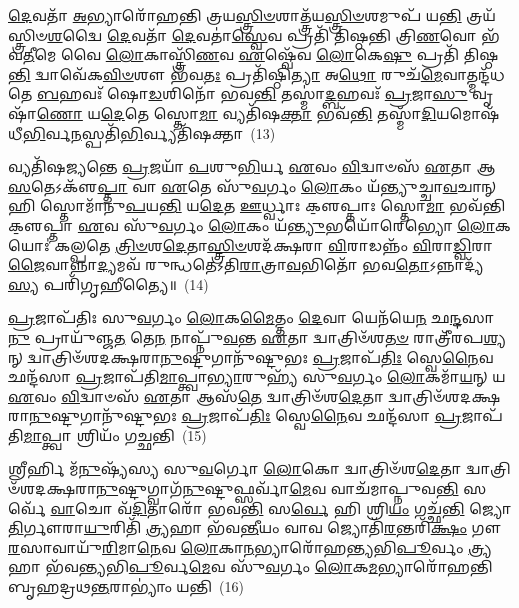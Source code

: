 \-\ul{𑌦𑍇}\-𑌵𑌤𑌾᳴ \ul{𑌅}\-𑌭𑍍𑌯𑌾𑌰𑍋᳴𑌹𑌨𑍍𑌤𑌿 𑌤𑍍𑌰𑌯\-\ul{𑌸𑍍𑌤𑍍𑌰𑌿}\-\-\ul{𑍞}\-𑌶𑌾𑌤𑍍𑌤𑍍𑌰᳴𑌯\-\ul{𑌸𑍍𑌤𑍍𑌰𑌿}\-\-\ul{𑍞}\-𑌶𑌮𑍁𑌪᳴ 𑌯\-\ul{𑌨𑍍𑌤𑌿} 𑌤𑍍𑌰𑌯᳴𑌸𑍍𑌤𑍍𑌰𑌿𑍞\-\ul{𑌶}\-𑌦𑍍𑌵𑍈 \ul{𑌦𑍇}\-𑌵𑌤𑌾᳴ \ul{𑌦𑍇}\-𑌵𑌤𑌾॑\-\ul{𑌸𑍍𑌵𑍇}\-𑌵 𑌪𑍍𑌰𑌤𑌿᳴ 𑌤𑌿𑌷𑍍𑌠𑌨𑍍𑌤𑌿 𑌤𑍍𑌰𑌿\-\ul{𑌣}\-𑌵𑍋 𑌭᳴𑌵\-\ul{𑌤𑍀}\-𑌮𑍇 𑌵𑍈 \ul{𑌲𑍋}\-𑌕𑌾𑌸𑍍𑌤𑍍𑌰𑌿᳴\-\ul{𑌣}\-𑌵 \ul{𑌏}\-𑌷𑍍𑌵𑍇᳴𑌵 \ul{𑌲𑍋}\-𑌕𑍇\-\ul{𑌷𑍁} 𑌪𑍍𑌰𑌤𑌿᳴ 𑌤𑌿𑌷𑍍𑌠\-\ul{𑌨𑍍𑌤𑌿} 𑌦𑍍𑌵𑌾𑌵𑍇᳴𑌕\-\ul{𑌵𑌿}\-\-\ul{𑍞}\-𑌶𑍗 𑌭᳴𑌵\-\ul{𑌤𑌃} 𑌪𑍍𑌰𑌤𑌿᳴𑌷𑍍𑌠𑌿\-\ul{𑌤𑍍𑌯𑌾} 𑌅\-\ul{𑌥𑍋} 𑌰𑍁𑌚᳴\-\ul{𑌮𑍇}\-𑌵𑌾𑌤𑍍𑌮𑌨𑍍𑌦᳴𑌧𑌤𑍇 \ul{𑌬}\-𑌹𑌵𑌃᳴ 𑌷𑍋\-\ul{𑌡}\-𑌶𑌿𑌨𑍋᳴ 𑌭𑌵\-\ul{𑌨𑍍𑌤𑌿} 𑌤𑌸𑍍𑌮𑌾॑\-\ul{𑌦𑍍𑌬}\-𑌹𑌵𑌃᳴ \ul{𑌪𑍍𑌰}\-𑌜𑌾\-\ul{𑌸𑍁} 𑌵𑍃𑌷𑌾᳴\-\ul{𑌣𑍋} 𑌯\-\ul{𑌦𑍇}\-𑌤𑍇 𑌸𑍍𑌤𑍋\-\ul{𑌮𑌾} 𑌵𑍍𑌯𑌤𑌿᳴𑌷\-\ul{𑌕𑍍𑌤𑌾} 𑌭𑌵᳴\-\ul{𑌨𑍍𑌤𑌿} 𑌤𑌸𑍍𑌮𑌾᳴\-\ul{𑌦𑌿}\-𑌯𑌮𑍋𑌷᳴𑌧𑍀\-\ul{𑌭𑌿}\-𑌰𑍍𑌵\-\ul{𑌨}\-𑌸𑍍𑌪𑌤𑌿᳴\-\ul{𑌭𑌿}\-𑌰𑍍𑌵𑍍𑌯𑌤𑌿᳴𑌷𑌕𑍍𑌤𑌾~(13)

𑌵𑍍𑌯𑌤𑌿᳴𑌷𑌜𑍍𑌯𑌨𑍍𑌤𑍇 \ul{𑌪𑍍𑌰}\-𑌜𑌯𑌾᳴ \ul{𑌪}\-𑌶𑍁\-\ul{𑌭𑌿}\-𑌰𑍍𑌯 \ul{𑌏}\-𑌵𑌂 \ul{𑌵𑌿}\-𑌦𑍍𑌵𑌾𑍞𑌸᳴ \ul{𑌏}\-𑌤𑌾 𑌆\-\ul{𑌸}\-𑌤𑍇\-𑌽𑌕𑍢᳴\-\ul{𑌪𑍍𑌤𑌾} 𑌵𑌾 \ul{𑌏}\-𑌤𑍇 𑌸𑍁᳴\-\ul{𑌵}\-𑌰𑍍𑌗𑌂 \ul{𑌲𑍋}\-𑌕𑌂 𑌯᳴𑌨𑍍𑌤𑍍𑌯𑍁𑌚𑍍𑌚𑌾\-\ul{𑌵}\-𑌚𑌾𑌨𑍍 𑌹𑌿 𑌸𑍍𑌤𑍋𑌮𑌾᳴𑌨𑍁\-\ul{𑌪}\-𑌯\-\ul{𑌨𑍍𑌤𑌿} 𑌯\-\ul{𑌦𑍇}\-𑌤 \ul{𑌊}\-𑌰𑍍𑌧𑍍𑌵𑌾𑌃 𑌕𑍢॒𑌪𑍍𑌤𑌾𑌃 𑌸𑍍𑌤𑍋\-\ul{𑌮𑌾} 𑌭𑌵᳴𑌨𑍍𑌤𑌿 𑌕𑍢॒𑌪𑍍𑌤𑌾 \ul{𑌏}\-𑌵 𑌸𑍁᳴\-\ul{𑌵}\-𑌰𑍍𑌗𑌂 \ul{𑌲𑍋}\-𑌕𑌂 𑌯᳴\-\ul{𑌨𑍍𑌤𑍍𑌯𑍁}\-𑌭𑌯𑍋᳴𑌰𑍇𑌭𑍍𑌯𑍋 \ul{𑌲𑍋}\-𑌕𑌯𑍋𑌃॑ 𑌕𑌲𑍍𑌪𑌤𑍇 \ul{𑌤𑍍𑌰𑌿}\-\-\ul{𑍞}\-𑌶\-\ul{𑌦𑍇}\-𑌤𑌾\-\ul{𑌸𑍍𑌤𑍍𑌰𑌿}\-\-\ul{𑍞}\-𑌶𑌦᳴𑌕𑍍𑌷𑌰𑌾 \ul{𑌵𑌿}\-𑌰𑌾𑌡𑌨𑍍𑌨𑌂᳴ \ul{𑌵𑌿}\-𑌰𑌾\-\ul{𑌡𑍍𑌵𑌿}\-𑌰𑌾\-\ul{𑌜𑍈}\-𑌵𑌾𑌨𑍍𑌨𑌾\-\ul{𑌦𑍍𑌯}\-𑌮𑌵᳴ 𑌰𑍁𑌨𑍍𑌧𑌤𑍇\-𑌽𑌤𑌿\-\ul{𑌰𑌾}\-𑌤𑍍𑌰𑌾\-\ul{𑌵}\-𑌭𑌿𑌤𑍋᳴ 𑌭𑌵\-\ul{𑌤𑍋}\-\-𑌽𑌨𑍍𑌨𑌾𑌦𑍍𑌯᳴\-\ul{𑌸𑍍𑌯} 𑌪𑌰𑌿᳴𑌗𑍃𑌹𑍀𑌤𑍍𑌯𑍈॥~(14)

{\anuvakamend[{𑌓𑌷᳴𑌧𑍀𑌃 𑌸𑌂𑌵\-\ul{𑌥𑍍𑌸}\-𑌰 \ul{𑌏}\-𑌵𑌾𑌵᳴ 𑌪𑍍𑌰\-\ul{𑌤𑌿}\-𑌷𑍍𑌠𑌾\-\ul{𑌯} 𑌵𑍍𑌯𑌤𑌿᳴\-\ul{𑌷}\-𑌕𑍍𑌤𑍈\-\ul{𑌕𑌾}\-𑌨𑍍𑌨𑌪᳴\-\ul{𑌞𑍍𑌚𑌾}\-𑌶𑌚𑍍𑌚᳴}]}%

\-\ul{𑌪𑍍𑌰}\-𑌜𑌾𑌪᳴𑌤𑌿𑌃 𑌸𑍁\-\ul{𑌵}\-𑌰𑍍𑌗𑌂 \ul{𑌲𑍋}\-𑌕\-\ul{𑌮𑍈}\-𑌤𑍍𑌤𑌂 \ul{𑌦𑍇}\-𑌵𑌾 𑌯𑍇𑌨᳴𑌯𑍇\-\ul{𑌨} 𑌛\-\ul{𑌨𑍍𑌦}\-𑌸𑌾\-\ul{𑌨𑍁} 𑌪𑍍𑌰𑌾𑌯𑍁᳴𑌞𑍍𑌜\-\ul{𑌤} 𑌤𑍇\-\ul{𑌨} 𑌨𑌾𑌪𑍍𑌨𑍁᳴\-\ul{𑌵}\-𑌨𑍍𑌤 \ul{𑌏}\-𑌤𑌾 𑌦𑍍𑌵𑌾𑌤𑍍𑌰𑌿𑍞᳴𑌶\-\ul{𑌤}\-\-\ul{𑍞} 𑌰𑌾𑌤𑍍𑌰𑍀᳴𑌰𑌪\-\ul{𑌶𑍍𑌯}\-𑌨𑍍 𑌦𑍍𑌵𑌾𑌤𑍍𑌰𑌿𑍞᳴𑌶𑌦𑌕𑍍𑌷𑌰𑌾\-\ul{𑌨𑍁}\-𑌷𑍍𑌟𑍁𑌗𑌾𑌨𑍁᳴𑌷𑍍𑌟𑍁𑌭𑌃 \ul{𑌪𑍍𑌰}\-𑌜𑌾𑌪᳴\-\ul{𑌤𑌿𑌃} 𑌸𑍍𑌵𑍇\-\ul{𑌨𑍈}\-𑌵 𑌛𑌨𑍍𑌦᳴𑌸𑌾 \ul{𑌪𑍍𑌰}\-𑌜𑌾𑌪᳴𑌤𑌿\-\ul{𑌮𑌾}\-𑌪𑍍𑌤𑍍𑌵𑌾\-\ul{𑌭𑍍𑌯𑌾}\-𑌰𑍁𑌹𑍍𑌯᳴ 𑌸𑍁\-\ul{𑌵}\-𑌰𑍍𑌗𑌂 \ul{𑌲𑍋}\-𑌕𑌮𑌾᳴\-\ul{𑌯}\-𑌨𑍍 𑌯 \ul{𑌏}\-𑌵𑌂 \ul{𑌵𑌿}\-𑌦𑍍𑌵𑌾𑍞𑌸᳴ \ul{𑌏}\-𑌤𑌾 𑌆𑌸᳴\-\ul{𑌤𑍇} 𑌦𑍍𑌵𑌾𑌤𑍍𑌰𑌿𑍞᳴𑌶\-\ul{𑌦𑍇}\-𑌤𑌾 𑌦𑍍𑌵𑌾𑌤𑍍𑌰𑌿𑍞᳴𑌶𑌦𑌕𑍍𑌷𑌰𑌾\-\ul{𑌨𑍁}\-𑌷𑍍𑌟𑍁𑌗𑌾𑌨𑍁᳴𑌷𑍍𑌟𑍁𑌭𑌃 \ul{𑌪𑍍𑌰}\-𑌜𑌾𑌪᳴\-\ul{𑌤𑌿𑌃} 𑌸𑍍𑌵𑍇\-\ul{𑌨𑍈}\-𑌵 𑌛𑌨𑍍𑌦᳴𑌸𑌾 \ul{𑌪𑍍𑌰}\-𑌜𑌾𑌪᳴𑌤𑌿\-\ul{𑌮𑌾}\-𑌪𑍍𑌤𑍍𑌵𑌾 𑌶𑍍𑌰𑌿𑌯𑌂᳴ 𑌗𑌚𑍍𑌛𑌨𑍍𑌤𑌿~(15)

𑌶𑍍𑌰𑍀𑌰𑍍\mbox{}𑌹𑌿 𑌮᳴\-\ul{𑌨𑍁}\-𑌷𑍍𑌯᳴𑌸𑍍𑌯 𑌸𑍁\-\ul{𑌵}\-𑌰𑍍𑌗𑍋 \ul{𑌲𑍋}\-𑌕𑍋 𑌦𑍍𑌵𑌾𑌤𑍍𑌰𑌿𑍞᳴𑌶\-\ul{𑌦𑍇}\-𑌤𑌾 𑌦𑍍𑌵𑌾𑌤𑍍𑌰𑌿𑍞᳴𑌶𑌦𑌕𑍍𑌷𑌰𑌾\-\ul{𑌨𑍁}\-𑌷𑍍𑌟𑍁𑌗𑍍𑌵𑌾𑌗᳴\-\ul{𑌨𑍁}\-𑌷𑍍𑌟𑍁𑌫𑍍𑌸𑌰𑍍𑌵𑌾᳴\-\ul{𑌮𑍇}\-𑌵 𑌵𑌾𑌚᳴𑌮𑌾𑌪𑍍𑌨𑍁𑌵\-\ul{𑌨𑍍𑌤𑌿} 𑌸𑌰𑍍𑌵𑍇᳴ \ul{𑌵𑌾}\-𑌚𑍋 𑌵᳴\-\ul{𑌦𑌿}\-𑌤𑌾𑌰𑍋᳴ 𑌭𑌵\-\ul{𑌨𑍍𑌤𑌿} 𑌸\-\ul{𑌰𑍍𑌵𑍇} 𑌹𑌿 𑌶𑍍𑌰𑌿\-\ul{𑌯𑌂} 𑌗𑌚𑍍𑌛᳴\-\ul{𑌨𑍍𑌤𑌿} 𑌜𑍍𑌯𑍋\-\ul{𑌤𑌿}\-𑌰𑍍𑌗𑍗𑌰𑌾\-\ul{𑌯𑍁}\-𑌰𑌿𑌤𑌿᳴ \ul{𑌤𑍍𑌰𑍍𑌯}\-𑌹𑌾 𑌭᳴𑌵\-\ul{𑌨𑍍𑌤𑍀}\-𑌯𑌂 𑌵𑌾𑌵 𑌜𑍍𑌯𑍋𑌤𑌿᳴\-\ul{𑌰}\-𑌨𑍍𑌤𑌰𑌿᳴\-\ul{𑌕𑍍𑌷𑌂} 𑌗𑍗\-\ul{𑌰}\-𑌸𑌾𑌵𑌾𑌯𑍁᳴\-\-\ul{𑌰𑌿}\-𑌮𑌾\-\ul{𑌨𑍇}\-𑌵 \ul{𑌲𑍋}\-𑌕𑌾\-\ul{𑌨}\-𑌭𑍍𑌯𑌾𑌰𑍋᳴𑌹𑌨𑍍𑌤𑍍𑌯𑌭𑌿\-\ul{𑌪𑍂}\-𑌰𑍍𑌵𑌂 \ul{𑌤𑍍𑌰𑍍𑌯}\-𑌹𑌾 𑌭᳴𑌵𑌨𑍍𑌤𑍍𑌯𑌭𑌿\-\ul{𑌪𑍂}\-𑌰𑍍𑌵\-\ul{𑌮𑍇}\-𑌵 𑌸𑍁᳴\-\ul{𑌵}\-𑌰𑍍𑌗𑌂 \ul{𑌲𑍋}\-𑌕\-\ul{𑌮}\-𑌭𑍍𑌯𑌾𑌰𑍋᳴𑌹𑌨𑍍𑌤𑌿 𑌬𑍃𑌹𑌦𑍍𑌰𑌥\-\ul{𑌨𑍍𑌤}\-𑌰𑌾\-𑌭𑍍𑌯𑌾𑌂॑ 𑌯𑌨𑍍𑌤𑌿~(16)

